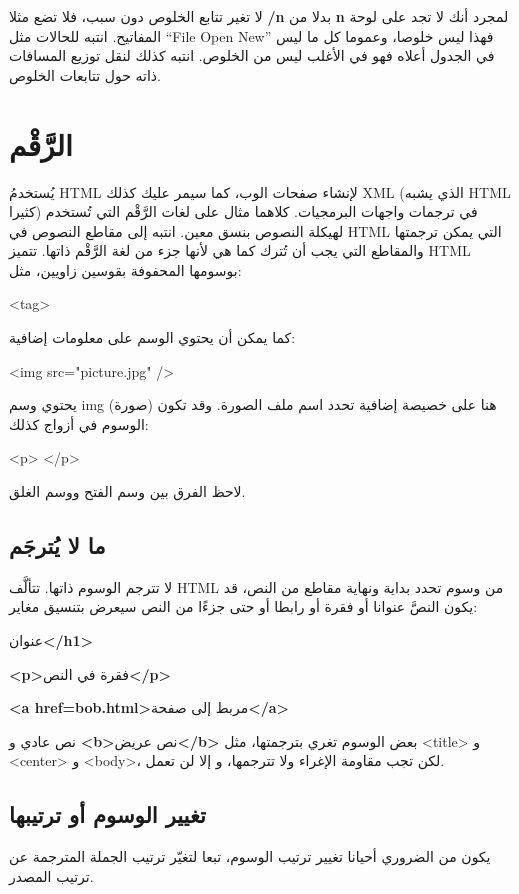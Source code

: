 لا تغير تتابع الخلوص دون سبب، فلا تضع مثلا {\bf ‪/n‬} بدلا من {\bf
‪ n‬} لمجرد أنك لا تجد   على لوحة
المفاتيح. انتبه للحالات مثل “File   Open
  New” فهذا ليس خلوصا، وعموما كل ما ليس في الجدول أعلاه
فهو في الأغلب ليس من الخلوص. انتبه كذلك لنقل توزيع المسافات ذاته حول
تتابعات الخلوص.

\section{الرَّقْم}
يُستخدمُ HTML لإنشاء صفحات الوب، كما سيمر عليك كذلك XML (الذي يشبه HTML
كثيرا) في ترجمات واجهات البرمجيات. كلاهما مثال على لغات الرَّقْم التي
تُستخدم لهيكلة النصوص بنسق معين. انتبه إلى مقاطع النصوص في HTML التي
يمكن ترجمتها والمقاطع التي يجب أن تُترك كما هي لأنها جزء من لغة
الرَّقْم ذاتها. تتميز HTML بوسومها المحفوفة بقوسين زاويين، مثل:

<tag>

كما يمكن أن يحتوي الوسم على معلومات إضافية:

<img src="picture.jpg" />

يحتوي وسم img (صورة) هنا على خصيصة إضافية تحدد اسم ملف الصورة. وقد تكون
الوسوم في أزواج كذلك:

<p> </p>

لاحظ الفرق بين وسم الفتح ووسم الغلق.

\subsection{ما لا يُترجَم}
لا تترجم الوسوم ذاتها. تتألَّف HTML من وسوم تحدد بداية ونهاية مقاطع من
النص، قد يكون النصَّ عنوانا أو فقرة أو رابطا أو حتى جزءًا من النص سيعرض
بتنسيق مغاير:

\startitemize[1]
\item {\bf <h1>}عنوان{\bf </h1>}
\item {\bf <p>}فقرة في النص{\bf </p>}
\item {\bf <a href=bob.html>}مربط إلى صفحة{\bf </a>}
\item نص عادي و {\bf <b>}نص عريض{\bf </b>}
\stopitemize
بعض الوسوم تغري بترجمتها، مثل <title> و <center> و <body>، لكن تجب
مقاومة الإغراء ولا تترجمها، و إلا لن تعمل.

\subsection{تغيير الوسوم أو ترتيبها}
يكون من الضروري أحيانا تغيير ترتيب الوسوم، تبعا لتغيّر ترتيب الجملة
المترجمة عن ترتيب المصدر.

